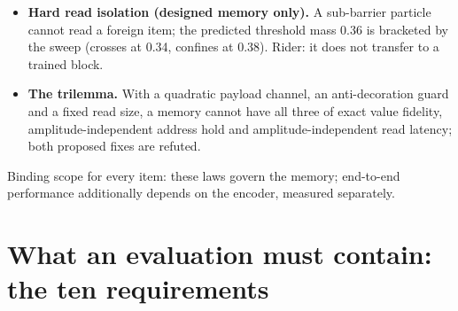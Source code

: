 \documentclass{article} %
\newcommand{\sci}[2]{\ensuremath{#1\times10^{#2}}}
\begin{document}
\begin{itemize}[leftmargin=*,itemsep=1pt]
  matches saved-activation gradients to \sci{2.1}{-6} relative in float32, with peak activation
  memory 6.3 KB against 6.00 MB at $T=1024$; exact only at zero damping. %
\item \textbf{Hard read isolation (designed memory only).} A sub-barrier particle cannot read a
  foreign item; the predicted threshold mass 0.36 is bracketed by the sweep (crosses at 0.34,
  confines at 0.38). Rider: it does not transfer to a trained block. %
\item \textbf{The trilemma.} With a quadratic payload channel, an anti-decoration guard and a fixed
read size, a memory cannot have all three of exact value fidelity, amplitude-independent address
  hold and amplitude-independent read latency; both proposed fixes are refuted.
\end{itemize}
Binding scope for every item: these laws govern the memory; end-to-end performance additionally
depends on the encoder, measured separately. %

\section{What an evaluation must contain: the ten requirements}
\label{app:bench}
\end{document}

